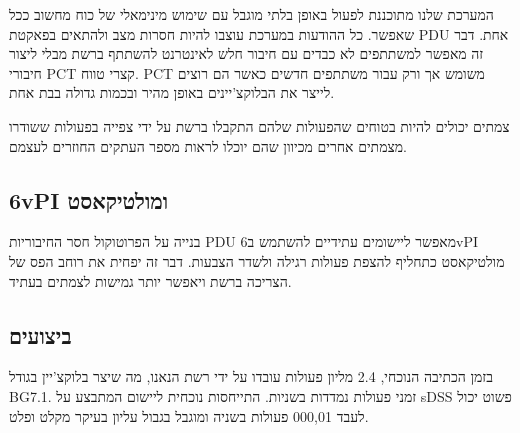 המערכת שלנו מתוכננת לפעול באופן בלתי מוגבל עם שימוש מינימאלי של כוח מחשוב ככל שאפשר. כל ההודעות במערכת עוצבו להיות חסרות מצב ולהתאים בפאקטת
PDU
אחת. דבר זה מאפשר למשתתפים לא כבדים עם חיבור חלש לאינטרנט להשתתף ברשת מבלי ליצור חיבורי
PCT
קצרי טווח.
PCT
משומש אך ורק עבור משתתפים חדשים כאשר הם רוצים לייצר את הבלוקצ'יינים באופן מהיר ובכמות גדולה בבת אחת.

צמתים יכולים להיות בטוחים שהפעולות שלהם התקבלו ברשת על ידי צפייה בפעולות ששודרו מצמתים אחרים מכיוון שהם יוכלו לראות מספר העתקים החוזרים לעצמם.

\subsection{6vPI ומולטיקאסט}
בנייה על הפרוטוקול חסר החיבוריות PDU מאפשר ליישומים עתידיים להשתמש ב6vPI 
מולטיקאסט כתחליף להצפת פעולות רגילה ולשדר הצבעות.
דבר זה יפחית את רוחב הפס של הצריכה ברשת ויאפשר יותר גמישות לצמתים בעתיד.


\subsection{ביצועים}

בזמן הכתיבה הנוכחי, 
2.4 מליון פעולות
עובדו על ידי רשת הנאנו,
מה שיצר בלוקצ'יין בגודל 
BG7.1.
זמני פעולות נמדדות בשניות.
התייחסות נוכחית ליישום המתבצע על
sDSS
פשוט יכול לעבד
000,01
פעולות בשניה ומוגבל בגבול עליון בעיקר מקלט ופלט.
